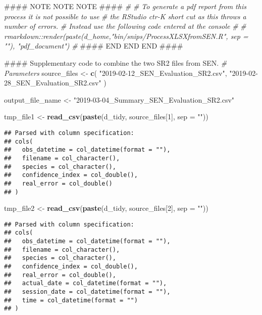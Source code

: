 \documentclass[]{article}
\newenvironment{Shaded}{\begin{snugshade}}{\end{snugshade}}
\newcommand{\KeywordTok}[1]{\textcolor[rgb]{0.13,0.29,0.53}{\textbf{#1}}}
\newcommand{\DataTypeTok}[1]{\textcolor[rgb]{0.13,0.29,0.53}{#1}}
\newcommand{\DecValTok}[1]{\textcolor[rgb]{0.00,0.00,0.81}{#1}}
\newcommand{\StringTok}[1]{\textcolor[rgb]{0.31,0.60,0.02}{#1}}
\newcommand{\CommentTok}[1]{\textcolor[rgb]{0.56,0.35,0.01}{\textit{#1}}}
\newcommand{\RegionMarkerTok}[1]{#1}
\newcommand{\AlertTok}[1]{\textcolor[rgb]{0.94,0.16,0.16}{#1}}
\newcommand{\NormalTok}[1]{#1}
\begin{document}
\begin{Shaded}
\begin{Highlighting}[]
\NormalTok{#### }\AlertTok{NOTE} \AlertTok{NOTE} \AlertTok{NOTE}\NormalTok{ ####}
\CommentTok{#}
\CommentTok{# To generate a pdf report from this process  it is not possible to use }
\CommentTok{# the RStudio ctr-K short cut as this throws a number of errors.}
\CommentTok{# Instead use the following code entered at the console}
\CommentTok{#}
\CommentTok{# rmarkdown::render(paste(d_home,"bin/snips/ProcessXLSXfromSEN.R", sep = ""), "pdf_document")}
\CommentTok{#}
\NormalTok{#### }\RegionMarkerTok{END} \RegionMarkerTok{END} \RegionMarkerTok{END}\NormalTok{ ####}


\NormalTok{#### Supplementary code to combine the two SR2 files from SEN.}
\CommentTok{# Parameters}
\NormalTok{source_files <-}\StringTok{ }\KeywordTok{c}\NormalTok{(}
  \StringTok{"2019-02-12_SEN_Evaluation_SR2.csv"}\NormalTok{,}
  \StringTok{"2019-02-28_SEN_Evaluation_SR2.csv"}
\NormalTok{)}

\NormalTok{output_file_name <-}\StringTok{ "2019-03-04_Summary_SEN_Evaluation_SR2.csv"}

\NormalTok{tmp_file1 <-}\StringTok{ }\KeywordTok{read_csv}\NormalTok{(}\KeywordTok{paste}\NormalTok{(d_tidy, source_files[}\DecValTok{1}\NormalTok{], }\DataTypeTok{sep =} \StringTok{""}\NormalTok{))}
\end{Highlighting}
\end{Shaded}

\begin{verbatim}
## Parsed with column specification:
## cols(
##   obs_datetime = col_datetime(format = ""),
##   filename = col_character(),
##   species = col_character(),
##   confidence_index = col_double(),
##   real_error = col_double()
## )
\end{verbatim}

\begin{Shaded}
\begin{Highlighting}[]
\NormalTok{tmp_file2 <-}\StringTok{ }\KeywordTok{read_csv}\NormalTok{(}\KeywordTok{paste}\NormalTok{(d_tidy, source_files[}\DecValTok{2}\NormalTok{], }\DataTypeTok{sep =} \StringTok{""}\NormalTok{))}
\end{Highlighting}
\end{Shaded}

\begin{verbatim}
## Parsed with column specification:
## cols(
##   obs_datetime = col_datetime(format = ""),
##   filename = col_character(),
##   species = col_character(),
##   confidence_index = col_double(),
##   real_error = col_double(),
##   actual_date = col_datetime(format = ""),
##   session_date = col_datetime(format = ""),
##   time = col_datetime(format = "")
## )
\end{verbatim}
\end{document}
